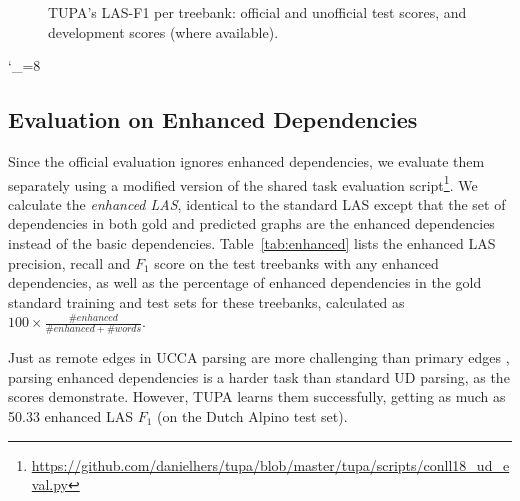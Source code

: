 \documentclass[11pt,a4paper]{article}
\begin{document}
\begin{figure*}[h]
    \caption{TUPA's LAS-F1 per treebank: official and unofficial test scores, and development scores (where available).
    \label{fig:test_per_corpus}}
\end{figure*}
\catcode`\_=8


\subsection{Evaluation on Enhanced Dependencies}\label{sec:enhanced_results}

Since the official evaluation ignores enhanced dependencies,
we evaluate them separately using a modified version of the shared task evaluation
script\footnote{\url{https://github.com/danielhers/tupa/blob/master/tupa/scripts/conll18_ud_eval.py}}.
We calculate the \textit{enhanced LAS},
identical to the standard LAS except that the set of dependencies
in both gold and predicted graphs are the enhanced dependencies instead
of the basic dependencies.
Table~\ref{tab:enhanced} lists the enhanced LAS precision, recall and $F_1$ score
on the test treebanks with any enhanced dependencies,
as well as the percentage of enhanced dependencies in the gold standard
training and test sets for these treebanks, calculated as
$100 \times \frac{\#enhanced}{\#enhanced + \#words}$.

Just as remote edges in UCCA parsing are more challenging
than primary edges \cite{hershcovich2017a},
parsing enhanced dependencies is a harder task than standard UD parsing,
as the scores demonstrate.
However, TUPA learns them successfully, getting as much as 50.33 enhanced LAS $F_1$
(on the Dutch Alpino test set).
\end{document}
